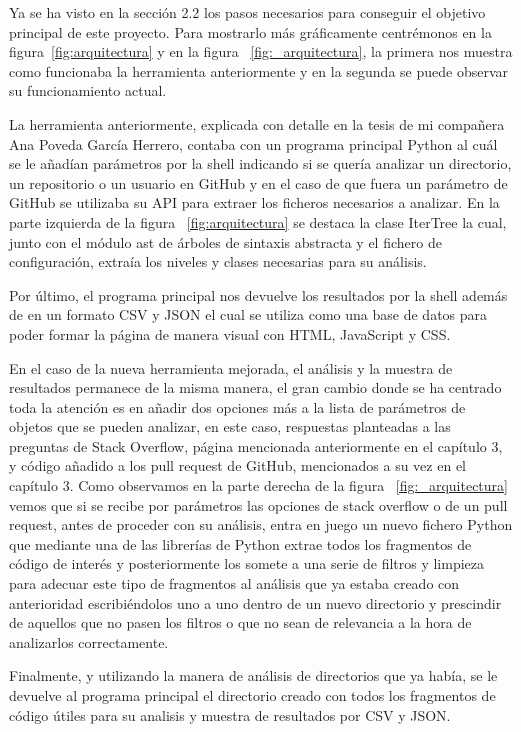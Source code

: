 \documentclass[a4paper, 12pt]{book}
\begin{document}
Ya se ha visto en la sección 2.2 los pasos necesarios para conseguir el objetivo principal de este proyecto. Para mostrarlo más gráficamente centrémonos en la figura~\ref{fig:arquitectura} y en la figura ~\ref{fig:_arquitectura}, la primera nos muestra como funcionaba la herramienta anteriormente y en la segunda se puede observar su funcionamiento actual.

La herramienta anteriormente, explicada con detalle en la tesis de mi compañera Ana Poveda García Herrero, contaba con un programa principal Python al cuál se le añadían parámetros por la shell indicando si se quería analizar un directorio, un repositorio o un usuario en GitHub y en el caso de que fuera un parámetro de GitHub se utilizaba su API para extraer los ficheros necesarios a analizar. En la parte izquierda de la figura ~\ref{fig:arquitectura} se destaca la clase IterTree la cual, junto con el módulo ast de árboles de sintaxis abstracta y el fichero de configuración, extraía los niveles y clases necesarias para su análisis. 

Por último, el programa principal nos devuelve los resultados por la shell además de en un formato CSV y JSON el cual se utiliza como una base de datos para poder formar la página de manera visual con HTML, JavaScript y CSS.

En el caso de la nueva herramienta mejorada, el análisis y la muestra de resultados permanece de la misma manera, el gran cambio donde se ha centrado toda la atención es en añadir dos opciones más a la lista de parámetros de objetos que se pueden analizar, en este caso, respuestas planteadas a las preguntas de Stack Overflow, página mencionada anteriormente en el capítulo 3, y código añadido a los pull request de GitHub, mencionados a su vez en el capítulo 3. Como observamos en la parte derecha de la figura ~\ref{fig:_arquitectura} vemos que si se recibe por parámetros las opciones de stack overflow o de un pull request, antes de proceder con su análisis, entra en juego un nuevo fichero Python que mediante una de las librerías de Python extrae todos los fragmentos de código de interés y posteriormente los somete a una serie de filtros y limpieza para adecuar este tipo de fragmentos al análisis que ya estaba creado con anterioridad escribiéndolos uno a uno dentro de un nuevo directorio y prescindir de aquellos que no pasen los filtros o que no sean de relevancia a la hora de analizarlos correctamente.

Finalmente, y utilizando la manera de análisis de directorios que ya había, se le devuelve al programa principal el directorio creado con todos los fragmentos de código útiles para su analisis y muestra de resultados por CSV y JSON.
\end{document}
